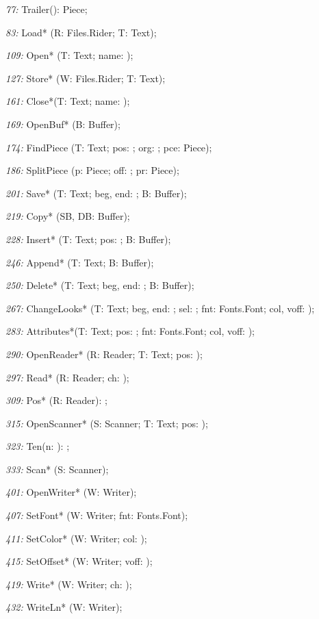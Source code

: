 \item{\it 77:} Trailer(): Piece;
\item{\it 83:} Load* (\VAR R: Files.Rider; T: Text);
\item{\it 109:} Open* (T: Text; name: \ARRAYOF\CHAR);
\item{\it 127:} Store* (\VAR W: Files.Rider; T: Text);
\item{\it 161:} Close*(T: Text; name: \ARRAYOF\CHAR);
\item{\it 169:} OpenBuf* (B: Buffer);
\item{\it 174:} FindPiece (T: Text; pos: \LONGINT; \VAR org: \LONGINT; \VAR pce: Piece);
\item{\it 186:} SplitPiece (p: Piece; off: \LONGINT; \VAR pr: Piece);
\item{\it 201:} Save* (T: Text; beg, end: \LONGINT; B: Buffer);
\item{\it 219:} Copy* (SB, DB: Buffer);
\item{\it 228:} Insert* (T: Text; pos: \LONGINT; B: Buffer);
\item{\it 246:} Append* (T: Text; B: Buffer);
\item{\it 250:} Delete* (T: Text; beg, end: \LONGINT; B: Buffer);
\item{\it 267:} ChangeLooks* (T: Text; beg, end: \LONGINT; sel: \SET; fnt: Fonts.Font; col, voff: \INTEGER);
\item{\it 283:} Attributes*(T: Text; pos: \LONGINT; \VAR fnt: Fonts.Font; \VAR col, voff: \INTEGER);
\item{\it 290:} OpenReader* (\VAR R: Reader; T: Text; pos: \LONGINT);
\item{\it 297:} Read* (\VAR R: Reader; \VAR ch: \CHAR);
\item{\it 309:} Pos* (\VAR R: Reader): \LONGINT;
\item{\it 315:} OpenScanner* (\VAR S: Scanner; T: Text; pos: \LONGINT);
\item{\it 323:} Ten(n: \INTEGER): \REAL;
\item{\it 333:} Scan* (\VAR S: Scanner);
\item{\it 401:} OpenWriter* (\VAR W: Writer);
\item{\it 407:} SetFont* (\VAR W: Writer; fnt: Fonts.Font);
\item{\it 411:} SetColor* (\VAR W: Writer; col: \INTEGER);
\item{\it 415:} SetOffset* (\VAR W: Writer; voff: \INTEGER);
\item{\it 419:} Write* (\VAR W: Writer; ch: \CHAR);
\item{\it 432:} WriteLn* (\VAR W: Writer);
